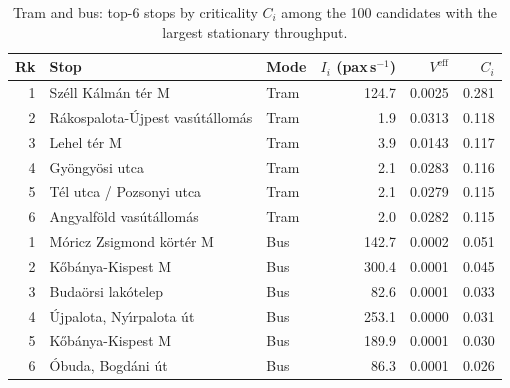 \begin{table}[htbp]
\centering
\small
\begin{tabular}{rllrrr}
\toprule
Rk & Stop & Mode & $I_i$ (pax\,s$^{-1}$) & $V^{\mathrm{eff}}$ & $C_i$ \\
\midrule
1 & Sz\'ell K\'alm\'an t\'er M & Tram & 124.7 & 0.0025 & 0.281 \\
2 & R\'akospalota-\'Ujpest vas\'ut\'allom\'as & Tram & 1.9 & 0.0313 & 0.118 \\
3 & Lehel t\'er M & Tram & 3.9 & 0.0143 & 0.117 \\
4 & Gy\"ongy\"osi utca & Tram & 2.1 & 0.0283 & 0.116 \\
5 & T\'el utca / Pozsonyi utca & Tram & 2.1 & 0.0279 & 0.115 \\
6 & Angyalf\"old vas\'ut\'allom\'as & Tram & 2.0 & 0.0282 & 0.115 \\
\midrule
1 & M\'oricz Zsigmond k\"ort\'er M & Bus & 142.7 & 0.0002 & 0.051 \\
2 & K\H{o}b\'anya-Kispest M & Bus & 300.4 & 0.0001 & 0.045 \\
3 & Buda\"orsi lak\'otelep & Bus & 82.6 & 0.0001 & 0.033 \\
4 & \'Ujpalota, Ny\'{\i}rpalota \'ut & Bus & 253.1 & 0.0000 & 0.031 \\
5 & K\H{o}b\'anya-Kispest M & Bus & 189.9 & 0.0001 & 0.030 \\
6 & \'Obuda, Bogd\'ani \'ut & Bus & 86.3 & 0.0001 & 0.026 \\
\bottomrule
\end{tabular}
\caption{Tram and bus: top-6 stops by criticality $C_i$ among the 100 candidates with the largest stationary throughput.}
\label{tab:resilience-surface}
\par{}
\end{table}

